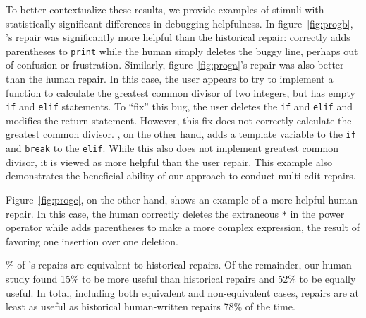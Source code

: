 To better contextualize these results, we provide examples of stimuli with
statistically significant differences in debugging helpfulness.
In figure~\ref{fig:progb}, \toolname's repair was
significantly more helpful than the historical repair:
 \toolname correctly adds parentheses to \texttt{print}
while the human simply deletes the
buggy line, perhaps out of confusion or frustration.
Similarly, figure~\ref{fig:proga}'s \toolname repair was also
better than the human repair. In this case, the user appears to try to
implement a function to calculate the greatest common divisor of two integers,
but has empty \texttt{if} and \texttt{elif} statements.
To ``fix'' this bug, the user
deletes the \texttt{if} and \texttt{elif} and modifies the return statement.
However, this fix does not correctly calculate the greatest common divisor.
\toolname, on the other hand, adds a template variable to the \texttt{if} and
\texttt{break} to the \texttt{elif}. While this also does not implement
greatest common divisor, it is viewed as more helpful
than the user repair. This example also demonstrates the beneficial ability of our approach
to conduct multi-edit repairs.

Figure~\ref{fig:progc}, on the other hand, shows an example of a more
helpful human repair. In this case, the
human correctly deletes the extraneous \texttt{*} in the power operator
while \toolname adds parentheses to make a more complex expression, the
result of favoring one insertion over one deletion.

\begin{framed}
  \% of \toolname's repairs are equivalent to historical repairs.
  Of the remainder, our human study found 15\% to be more useful than
  historical repairs and 52\% to be equally useful. In total, including
  both equivalent and non-equivalent cases, \toolname repairs are at
  least as useful as historical human-written repairs 78\% of the time.

\end{framed}
